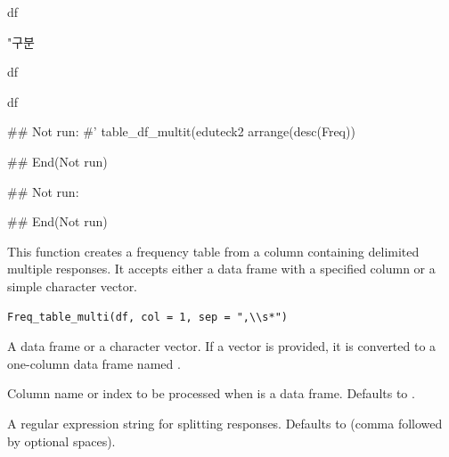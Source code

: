 \documentclass[a4paper]{book}
\begin{document}
%
\begin{Arguments}
\begin{ldescription}
\item[\code{df}] df

\item[\code{input}] "구분
\end{ldescription}
\end{Arguments}
%
\begin{Value}
df

df
\end{Value}
%
\begin{Examples}
\begin{ExampleCode}
\#\# Not run: 
#' table_df_multit(eduteck2 %
arrange(desc(Freq)) %

## End(Not run)

\#\# Not run: 



## End(Not run)
\end{ExampleCode}
\end{Examples}
%
\begin{Description}
This function creates a frequency table from a column containing delimited multiple responses.
It accepts either a data frame with a specified column or a simple character vector.
\end{Description}
%
\begin{Usage}
\begin{verbatim}
Freq_table_multi(df, col = 1, sep = ",\\s*")
\end{verbatim}
\end{Usage}
%
\begin{Arguments}
\begin{ldescription}
\item[\code{df}] A data frame or a character vector. If a vector is provided, it is converted to a one-column data frame named .

\item[\code{col}] Column name or index to be processed when  is a data frame. Defaults to .

\item[\code{sep}] A regular expression string for splitting responses. Defaults to  (comma followed by optional spaces).
\end{ldescription}
\end{Arguments}
\end{document}
